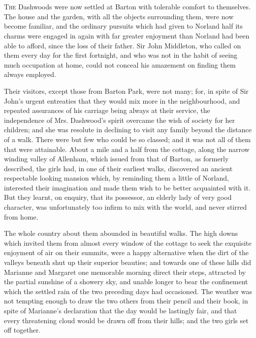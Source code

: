 \chapter[Chapter \thechapter]{}
\lettrine[lraise=0.3]{T}{he} Dashwoods were now settled at Barton with tolerable comfort to themselves. The house and the garden, with all the objects surrounding them, were now become familiar, and the ordinary pursuits which had given to Norland half its charms were engaged in again with far greater enjoyment than Norland had been able to afford, since the loss of their father. Sir John Middleton, who called on them every day for the first fortnight, and who was not in the habit of seeing much occupation at home, could not conceal his amazement on finding them always employed.

Their visitors, except those from Barton Park, were not many; for, in spite of Sir John's urgent entreaties that they would mix more in the neighbourhood, and repeated assurances of his carriage being always at their service, the independence of Mrs. Dashwood's spirit overcame the wish of society for her children; and she was resolute in declining to visit any family beyond the distance of a walk. There were but few who could be so classed; and it was not all of them that were attainable. About a mile and a half from the cottage, along the narrow winding valley of Allenham, which issued from that of Barton, as formerly described, the girls had, in one of their earliest walks, discovered an ancient respectable looking mansion which, by reminding them a little of Norland, interested their imagination and made them wish to be better acquainted with it. But they learnt, on enquiry, that its possessor, an elderly lady of very good character, was unfortunately too infirm to mix with the world, and never stirred from home.

The whole country about them abounded in beautiful walks. The high downs which invited them from almost every window of the cottage to seek the exquisite enjoyment of air on their summits, were a happy alternative when the dirt of the valleys beneath shut up their superior beauties; and towards one of these hills did Marianne and Margaret one memorable morning direct their steps, attracted by the partial sunshine of a showery sky, and unable longer to bear the confinement which the settled rain of the two preceding days had occasioned. The weather was not tempting enough to draw the two others from their pencil and their book, in spite of Marianne's declaration that the day would be lastingly fair, and that every threatening cloud would be drawn off from their hills; and the two girls set off together.

